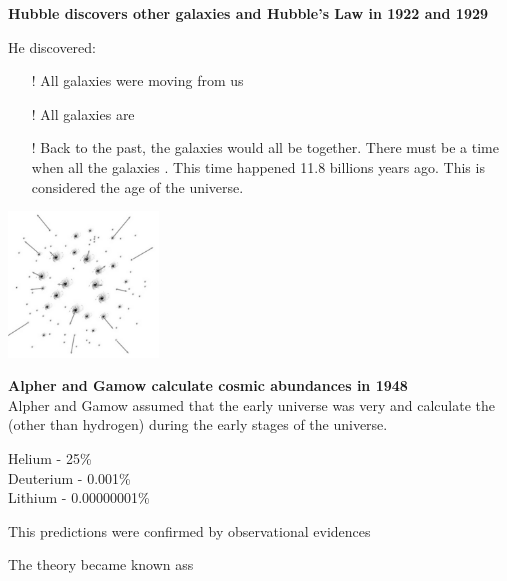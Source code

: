 \textbf{Hubble discovers other galaxies and Hubble's Law in 1922 and 1929}
\begin{paracol}{2}
    \begin{leftcolumn}
        He discovered:
        \begin{itemize}
            \item[!] All galaxies were moving  from us
            \item[!] All galaxies are 
            \item[!] Back to the past, the galaxies would all be  together. There must be a time when all the galaxies . This time happened 11.8 billions years ago. This is considered the age of the universe.
        \end{itemize}
    \end{leftcolumn}

    \begin{rightcolumn}
        \begin{center}
            \includegraphics[width=0.3\textwidth]{pictures/hubble.png}
        \end{center}
    \end{rightcolumn}
\end{paracol}

\newpage
\textbf{Alpher and Gamow calculate cosmic abundances in 1948} \\

Alpher and Gamow assumed that the early universe was very  and calculate the  (other than hydrogen) during the early stages of the universe.

\begin{center}
    Helium - 25\% \\
    Deuterium - 0.001\% \\
    Lithium - 0.00000001\%
\end{center}

This predictions were confirmed by observational evidences
\begin{greenblock}
    \begin{worddef}{The theory}
        became known ass 
    \end{worddef}
\end{greenblock}

